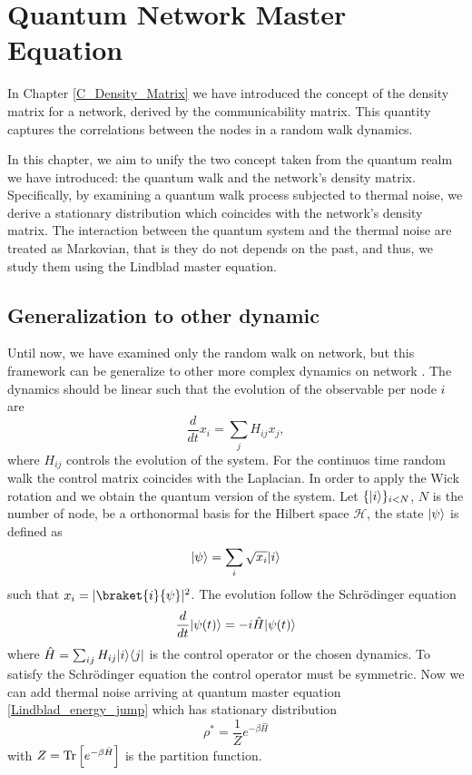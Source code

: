 \chapter{Quantum Network Master Equation}

In Chapter \ref{C_Density_Matrix} we have introduced the concept of the density matrix for a network, derived by the communicability matrix. This quantity captures the correlations between the nodes in a random walk dynamics.

In this chapter, we aim to unify the two concept taken from the quantum realm we have introduced: the quantum walk and the network's density matrix.
Specifically, by examining a quantum walk process subjected to thermal noise, we derive a stationary distribution which coincides with the network's density matrix. 
The interaction between the quantum system and the thermal noise are treated as Markovian, that is they do not depends on the past, and thus, we study them using the Lindblad master equation.






\section{Generalization to other dynamic}

Until now, we have examined only the random walk on network, but this framework can be generalize to other more complex dynamics on network \cite{De_Domenico_2023}.
The dynamics should be linear such that the evolution of the observable per node $i$ are 
\begin{equation}\label{general_dynamics}
    \frac{d}{dt} x_i = \sum_j H_{ij} x_j,
\end{equation}
where $H_{ij}$ controls the evolution of the system.
For the continuos time random walk the control matrix coincides with the Laplacian.
In order to apply the Wick rotation and we obtain the quantum version of the system.
Let $\{\lvert i\rangle\}_{i<N}$, $N$ is the number of node, be a orthonormal basis for the Hilbert space $\mathcal{H}$, the state $\lvert\psi\rangle$ is defined as
\begin{equation}
    \lvert\psi\rangle= \sum_i\sqrt{x_i}\lvert i\rangle
\end{equation}
such that $x_i = |\braket{i}{\psi}|^2$.
The evolution follow the Schrödinger equation
\begin{equation}
    \frac{d}{dt}\lvert\psi(t)\rangle = -i\hat H\lvert\psi(t)\rangle
\end{equation}
where 
$\hat H = \sum_{ij} H_{ij} \lvert i\rangle\langle j\rvert$ is the control operator or the chosen dynamics. To satisfy the Schrödinger equation the control operator must be symmetric.
Now we can add thermal noise arriving at quantum master equation \eqref{Lindblad_energy_jump} which has stationary distribution 
\begin{equation}
    \rho^*= \frac{1}{Z}e^{-\beta\hat H}
\end{equation}
with $Z= \operatorname{Tr}\left[e^{-\beta\hat H}\right]$ is the partition function.

